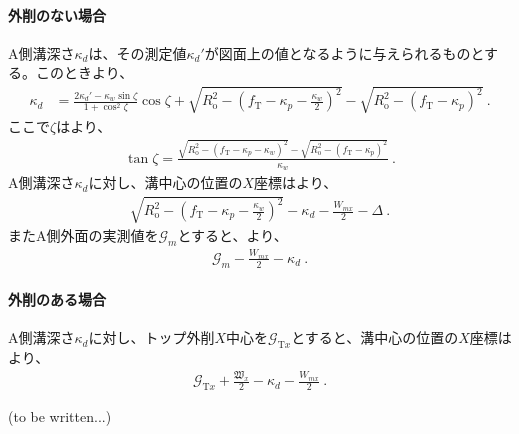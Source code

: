 \paragraph*{外削のない場合}
A側溝深さ$\kappa_d$は、その測定値$\kappa_d'$が図面上の値となるように与えられるものとする。このときより、
\begin{align*}
  \kappa_d
  &= \frac{2\kappa_d'-\kappa_w\sin\zeta}{1+\cos^2\zeta}\cos\zeta
     +\sqrt{R_\mathrm o^2-\left(f_\mathrm T-\kappa_p-\frac{\kappa_w}2\right)^{\!2}}
     -\sqrt{R_\mathrm o^2-\left(f_\mathrm T-\kappa_p\right)^2}\ .
\end{align*}
ここで$\zeta$はより、
\begin{align*}
  \tan\zeta
  = \frac{\sqrt{R_\mathrm o^2-\left(f_\mathrm T-\kappa_p-\kappa_w\right)^2}
          -\sqrt{R_\mathrm o^2-\left(f_\mathrm T-\kappa_p\right)^2}}
         {\kappa_w}\ .
\end{align*}
A側溝深さ$\kappa_d$に対し、溝中心の位置の$X$座標はより、
\begin{align*}
  \sqrt{R_\mathrm o^2-\left(f_\mathrm T-\kappa_p-\frac{\kappa_w}2\right)^{\!2}}-\kappa_d-\frac{W_{mx}}2
  -\varDelta\ .
\end{align*}
またA側外面の実測値を$\mathcal G_m$とすると、より、
\begin{align*}
  \mathcal G_m-\frac{W_{mx}}2-\kappa_d\ .
\end{align*}


\paragraph*{外削のある場合}
A側溝深さ$\kappa_d$に対し、トップ外削$X$中心を$\mathcal G_{\mathrm Tx}$とすると、溝中心の位置の$X$座標はより、
\begin{align*}
  \mathcal G_{\mathrm Tx}+\frac{\mathfrak W_x}2-\kappa_d-\frac{W_{mx}}2\ .
\end{align*}



\clearpage
(to be written...)


